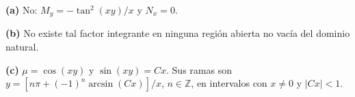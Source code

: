 \noindent\textbf{(a)} No: $M_y=-\tan^2(xy)/x$ y $N_x=0$.

\noindent\textbf{(b)} No existe tal factor integrante en ninguna región abierta no vacía del dominio natural.

\noindent\textbf{(c)} $\mu=\cos(xy)$ y $\sin(xy)=Cx$. Sus ramas son $y=[n\pi+(-1)^n\arcsin(Cx)]/x$, $n\in\mathbb Z$, en intervalos con $x\ne0$ y $|Cx|<1$.
